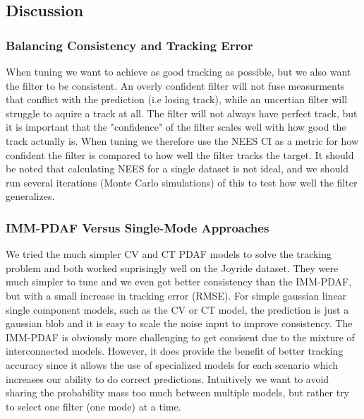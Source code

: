 \subsection{Discussion}
\subsubsection{Balancing Consistency and Tracking Error}
When tuning we want to achieve as good tracking as possible, but we also want the filter to be consistent. An overly confident filter will not fuse measurments that conflict with the prediction (i.e losing track), while an uncertian filter will struggle to aquire a track at all. The filter will not always have perfect track, but it is important that the "confidence" of the filter scales well with how good the track actually is.
When tuning we therefore use the NEES CI as a metric for how confident the filter is compared to how well the filter tracks the target. It should be noted that calculating NEES for a single dataset is not ideal, and we should run several iterations (Monte Carlo simulations) of this to test how well the filter generalizes.

\subsubsection{IMM-PDAF Versus Single-Mode Approaches} \label{whyimmpdaf}
We tried the much simpler CV and CT PDAF models to solve the tracking problem and both worked suprisingly well on the Joyride dataset. They were much simpler to tune and we even got better consistency than the IMM-PDAF, but with a small increase in tracking error (RMSE). For simple gaussian linear single component models, such as the CV or CT model, the prediction is just a gaussian blob and it is easy to scale the noise input to improve consistency. The IMM-PDAF is obviously more challenging to get consisent due to the mixture of interconnected models. However, it does provide the benefit of better tracking accuracy since it allows the use of specialized models for each scenario which increases our ability to do correct predictions. Intuitively we want to avoid sharing the probability mass too much between multiple models, but rather try to select one filter (one mode) at a time.

